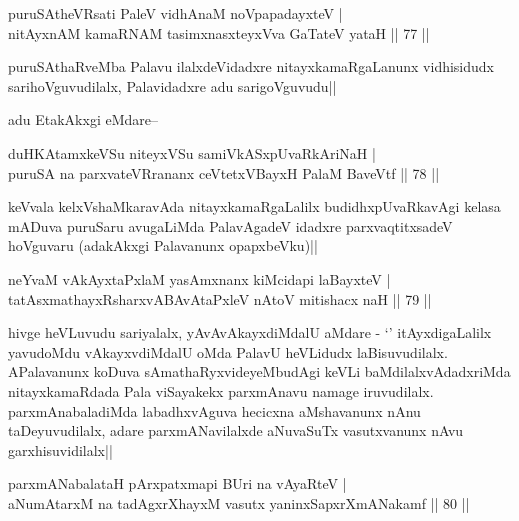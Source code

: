 \begin{shl}
puruSAtheVR\s sati PaleV vidhAnaM noVpapadayxteV |\\
nitAyxnAM kamaRNAM tasimxnasxteyxVva GaTateV yataH \hfill || 77 ||
\end{shl}

\begin{artha}
puruSAthaRveMba Palavu ilalxdeVidadxre nitayxkamaRgaLanunx vidhisidudx sarihoVguvudilalx, Palavidadxre adu sarigoVguvudu||
\end{artha}

\begin{artha}
adu EtakAkxgi eMdare--
\end{artha}

\begin{shl}
duHKAtamxkeVSu niteyxVSu samiVkASxpUvaRkAriNaH |\\
puruSA na parxvateVRrananx ceVtetxVBayxH PalaM BaveVtf \hfill || 78 ||
\end{shl}

\begin{artha}
keVvala kelxVshaMkaravAda  nitayxkamaRgaLalilx budidhxpUvaRkavAgi kelasa mADuva puruSaru avugaLiMda PalavAgadeV idadxre parxvaqtitxsadeV hoVguvaru (adakAkxgi Palavanunx opapxbeVku)||
\end{artha}


\begin{shl}
neYvaM vAkAyxtaPxlaM yasAmxnanx kiMcidapi laBayxteV |\\
tatAsxmathayxRsharxvABAvAtaPxleV nAtoV mitishacx naH \hfill || 79 ||
\end{shl}

\begin{artha}
hivge heVLuvudu sariyalalx, yAvAvAkayxdiMdalU aMdare - `\stext' itAyxdigaLalilx yavudoMdu vAkayxvdiMdalU oMda PalavU heVLidudx laBisuvudilalx. APalavanunx koDuva sAmathaRyxvideyeMbudAgi keVLi baMdilalxvAdadxriMda nitayxkamaRdada Pala viSayakekx parxmAnavu namage iruvudilalx. parxmAnabaladiMda labadhxvAguva hecicxna aMshavanunx nAnu taDeyuvudilalx, adare parxmANavilalxde aNuvaSuTx vasutxvanunx nAvu garxhisuvidilalx||
\end{artha}

\begin{shl}
parxmANabalataH pArxpatxmapi BUri na vAyaRteV |\\
aNumAtarxM na tadAgxrXhayxM vasutx yaninxSapxrXmANakamf \hfill || 80 ||
\end{shl}

